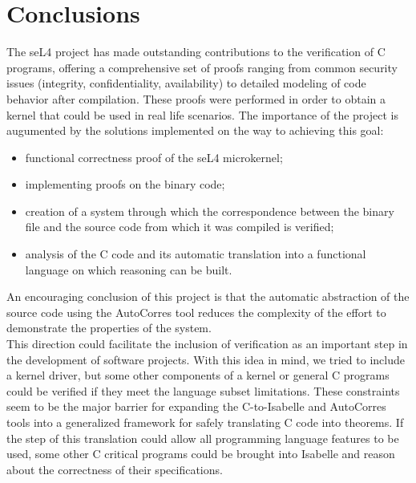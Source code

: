 \documentclass[conference]{IEEEtran}
\begin{document}
\section{Conclusions}
The seL4 project has made outstanding contributions to the verification of C programs, offering a comprehensive set of proofs ranging from common security issues (integrity, confidentiality, availability) to detailed modeling of code behavior after compilation. These proofs were performed in order to obtain a kernel that could be used in real life scenarios. The importance of the project is augumented by the solutions implemented on the way to achieving this goal:
\begin{itemize}
    \item functional correctness proof of the seL4 microkernel;
    \item implementing proofs on the binary code;
    \item creation of a system through which the correspondence between the binary file and the source code from which it was compiled is verified;
    \item analysis of the C code and its automatic translation into a functional language on which reasoning can be built.
\end{itemize}
An encouraging conclusion of this project is that the automatic abstraction of the source code using the AutoCorres tool reduces the complexity of the effort to demonstrate \cite{sweat} the properties of the system. \\
This direction could facilitate the inclusion of verification as an important step in the development of software projects. With this idea in mind, we tried to include a kernel driver, but some other components of a kernel or general C programs could be verified if they meet the language subset limitations. These constraints seem to be the major barrier for expanding the C-to-Isabelle and AutoCorres tools into a generalized framework for safely translating C code into theorems. If the step of this translation could allow all programming language features to be used, some other C critical programs could be brought into Isabelle and reason about the correctness of their specifications.
\end{document}
